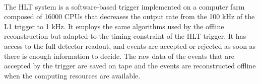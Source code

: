 \\
The HLT system \cite{Racz2002CMSTrigger} is a software-based trigger implemented on a computer farm composed of 16000 CPUs that decreases the output rate from the 100 kHz of the L1 trigger to 1 kHz. It employs the same algorithms used by the offline reconstruction but adapted to the timing constraint of the HLT trigger.
It has access to the full detector readout, and events are accepted or rejected as soon as there is enough information to decide. The raw data of the events that are accepted by the trigger are saved on tape and the events are reconstructed offline when the computing resources are available.

